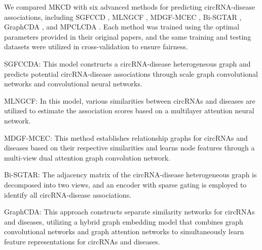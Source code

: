 \documentclass[journal=jcisd8,manuscript=article]{achemso}
\begin{document}
\begin{table}
    \renewcommand{\arraystretch}{1.2}
    \centering
    \caption{Results of the paired Wilcoxon test comparing MKCD with all other methods. }\label{tab:tab2}
    \vspace{-0.2cm}
    \label{tab:02}
    \vspace{-0.5cm}
\end{table}

We compared MKCD with six advanced methods for predicting circRNA-disease associations, including SGFCCD \cite{shang2024sgfccda}, MLNGCF \cite{wu2023mlngcf}, MDGF-MCEC \cite{wu2022mdgf}, Bi-SGTAR \cite{li2024bi}, GraphCDA \cite{dai2022graphcda}, and MPCLCDA \cite{liu2023mpclcda}. Each method was trained using the optimal parameters provided in their original papers, and the same training and testing datasets were utilized in cross-validation to ensure fairness.

SGFCCDA: This model constructs a circRNA-disease heterogeneous graph and predicts potential circRNA-disease associations through scale graph convolutional networks and convolutional neural networks.

MLNGCF: In this model, various similarities between circRNAs and diseases are utilized to estimate the association scores based on a multilayer attention neural network.

MDGF-MCEC: This method establishes relationship graphs for circRNAs and diseases based on their respective similarities and learns node features through a multi-view dual attention graph convolution network.

Bi-SGTAR: The adjacency matrix of the circRNA-disease heterogeneous graph is decomposed into two views, and an encoder with sparse gating is employed to identify all circRNA-disease associations.

GraphCDA: This approach constructs separate similarity networks for circRNAs and diseases, utilizing a hybrid graph embedding model that combines graph convolutional networks and graph attention networks to simultaneously learn feature representations for circRNAs and diseases.
\end{document}
